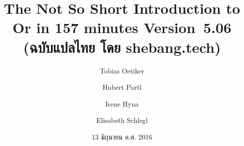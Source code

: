 \title{The Not So Short Introduction to \LaTeXe\\
Or \LaTeXe{} in 157 minutes Version~5.06 (ฉบับแปลไทย โดย shebang.tech)}

\author{Tobias Oetiker \and Hubert Partl \and Irene Hyna \and
  Elisabeth Schlegl}

\date{13 มิถุนายน ค.ศ. 2016}

\maketitle
